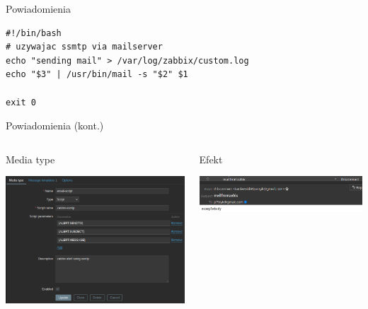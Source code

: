 \documentclass[presentation]{beamer}
\begin{document}
\begin{frame}[label={sec:org5af56ad},fragile]{Powiadomienia}
 \begin{verbatim}
#!/bin/bash
# uzywajac ssmtp via mailserver
echo "sending mail" > /var/log/zabbix/custom.log
echo "$3" | /usr/bin/mail -s "$2" $1

exit 0
\end{verbatim}
\end{frame}
\begin{frame}[label={sec:org2ededa5}]{Powiadomienia (kont.)}
\begin{columns}
\begin{column}{0.55\columnwidth}
\begin{block}{Media type}
\begin{center}
\includegraphics[width=.9\linewidth]{./data/zabbix/trigger.png}
\end{center}
\end{block}
\end{column}

\begin{column}{0.55\columnwidth}
\begin{block}{Efekt}
\begin{center}
\includegraphics[width=.9\linewidth]{./data/zabbix/mail.png}
\end{center}
\end{block}
\end{column}
\end{columns}
\end{frame}
\end{document}
